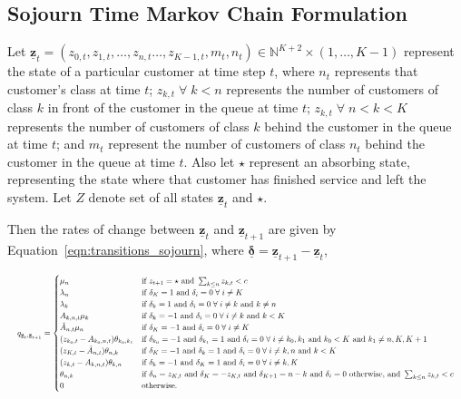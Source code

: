 \documentclass{article}
\begin{document}
\subsection{Sojourn Time Markov Chain Formulation}\label{sec:sojourn_formulation}
Let $\underline{\mathbf{z}}_t = (z_{0,t}, z_{1,t}, \dots, z_{n,t} \dots, z_{K-1,t}, m_t, n_t) \in \mathbb{N}^{K+2} \times (1, \dots, K - 1)$
represent the state of a particular customer at time step $t$, where $n_t$
represents that customer's class at time $t$; $z_{k,t} \; \forall \; k < n$
represents the number of customers of class $k$ in front of the customer in the
queue at time $t$; $z_{k,t} \; \forall \; n < k < K$ represents the number of
customers of class $k$ behind the customer in the queue at time $t$; and $m_t$
represent the number of customers of class $n_t$ behind the customer in the
queue at time $t$.
Also let $\star$ represent an absorbing state, representing the state where that
customer has finished service and left the system.
Let $Z$ denote set of all states $\underline{\mathbf{z}}_t$ and $\star$. 


Then the rates of change between $\underline{\mathbf{z}}_t$ and
$\underline{\mathbf{z}}_{t+1}$ are given by Equation~\ref{eqn:transitions_sojourn},
where $\underline{\mathbf{\delta}} = \underline{\mathbf{z}}_{t+1} - \underline{\mathbf{z}}_t$,

\begin{equation}\label{eqn:transitions_sojourn}
\resizebox{\textwidth}{!}{%
$q_{\underline{\mathbf{z}}_t, \underline{\mathbf{z}}_{t+1}} = 
\begin{cases}
\mu_n & \text{if } z_{t+1} = \star \text{ and } \sum_{k \leq n} z_{k, t} < c \\
\lambda_n & \text{if } \delta_K = 1 \text{ and } \delta_i = 0 \; \forall \; i \neq K \\
\lambda_k & \text{if } \delta_k = 1 \text{ and } \delta_i = 0 \; \forall \; i \neq k \text{ and } k \neq n\\
A_{k,n,t} \mu_k & \text{if } \delta_k = -1 \text{ and } \delta_i = 0 \; \forall \; i \neq k \text{ and } k < K\\
\tilde{A}_{n,t} \mu_n & \text{if } \delta_K = -1 \text{ and } \delta_i = 0 \; \forall \; i \neq K\\
(z_{k_0,t} - A_{k_0,n,t}) \theta_{k_0,k_1} & \text{if } \delta_{k_0} = -1 \text{ and } \delta_{k_1} = 1 \text{ and } \delta_i = 0 \; \forall \; i \neq k_0, k_1 \text{ and } k_0 < K \text{ and } k_1 \neq n, K, K+1 \\
(z_{K,t} - \tilde{A}_{n,t}) \theta_{n,k} & \text{if } \delta_K = -1 \text{ and } \delta_{k} = 1 \text{ and } \delta_i = 0 \; \forall \; i \neq k, n \text{ and } k < K \\
(z_{k,t} - A_{k,n,t}) \theta_{k,n} & \text{if } \delta_k = -1 \text{ and } \delta_K = 1 \text{ and } \delta_i = 0 \; \forall \; i \neq k, K \\
\theta_{n, k} & \text{if } \delta_n = z_{K,t} \text{ and } \delta_K = -z_{K,t} \text{ and } \delta_{K+1} = n - k \text{ and } \delta_i = 0 \text{ otherwise, and } \sum_{k \leq n} z_{k, t} < c \\
0 & \text{otherwise.}
\end{cases}$%
}
\end{equation}
\end{document}
